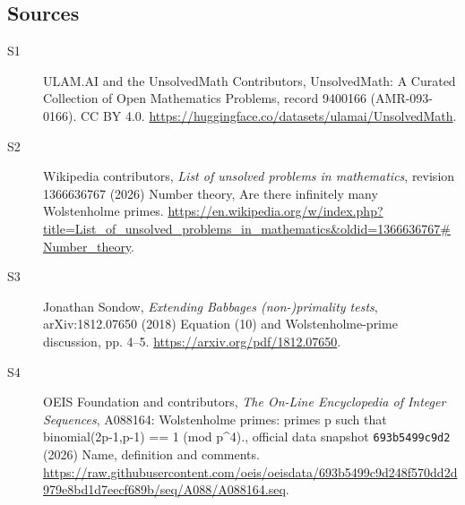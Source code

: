\documentclass[11pt]{article}
\begin{document}
\subsection{Sources}
\begin{description}
\item[\hypertarget{source:9400166:1}{S1}] ULAM.AI and the UnsolvedMath Contributors, UnsolvedMath: A Curated Collection of Open Mathematics Problems, record 9400166 (AMR-093-0166). CC BY 4.0. \url{https://huggingface.co/datasets/ulamai/UnsolvedMath}.
\item[\hypertarget{source:9400166:2}{S2}] Wikipedia contributors, \emph{List of unsolved problems in mathematics}, revision 1366636767 (2026) Number theory, Are there infinitely many Wolstenholme primes. \url{https://en.wikipedia.org/w/index.php?title=List_of_unsolved_problems_in_mathematics&oldid=1366636767#Number_theory}.
\item[\hypertarget{source:9400166:3}{S3}] Jonathan Sondow, \emph{Extending Babbage\textquotesingle s (non-)primality tests}, arXiv:1812.07650 (2018) Equation (10) and Wolstenholme-prime discussion, pp. 4--5. \url{https://arxiv.org/pdf/1812.07650}.
\item[\hypertarget{source:9400166:4}{S4}] OEIS Foundation and contributors, \emph{The On-Line Encyclopedia of Integer Sequences}, A088164: Wolstenholme primes: primes p such that binomial(2p-1,p-1) == 1 (mod p\textasciicircum{}4)., official data snapshot \texttt{693b5499c9d2} (2026) Name, definition and comments. \url{https://raw.githubusercontent.com/oeis/oeisdata/693b5499c9d248f570dd2d979e8bd1d7eecf689b/seq/A088/A088164.seq}.
\end{description}
\label{end:9400166}
\end{document}
